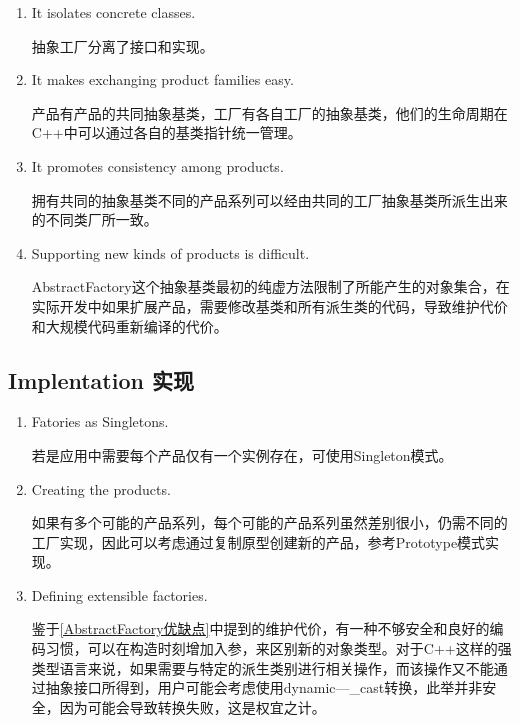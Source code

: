 \begin{enumerate}

\item It isolates concrete classes.

      抽象工厂分离了接口和实现。

\item It makes exchanging product families easy.
    
      产品有产品的共同抽象基类，工厂有各自工厂的抽象基类，他们的生命周期在C++中可以通过各自的基类指针统一管理。


\item It promotes consistency among products.

      拥有共同的抽象基类不同的产品系列可以经由共同的工厂抽象基类所派生出来的不同类厂所一致。

\item Supporting new kinds of products is difficult.

      AbstractFactory这个抽象基类最初的纯虚方法限制了所能产生的对象集合，在实际开发中如果扩展产品，需要修改基类和所有派生类的代码，导致维护代价和大规模代码重新编译的代价。
\end{enumerate}

\subsection{Implentation 实现}

\begin{enumerate}

\item Fatories as Singletons.

      若是应用中需要每个产品仅有一个实例存在，可使用Singleton模式。

\item Creating the products.

      如果有多个可能的产品系列，每个可能的产品系列虽然差别很小，仍需不同的工厂实现，因此可以考虑通过复制原型创建新的产品，参考Prototype模式实现。

\item Defining extensible factories.

      鉴于\ref{AbstractFactory优缺点}中提到的维护代价，有一种不够安全和良好的编码习惯，可以在构造时刻增加入参，来区别新的对象类型。对于C++这样的强类型语言来说，如果需要与特定的派生类别进行相关操作，而该操作又不能通过抽象接口所得到，用户可能会考虑使用dynamic—_cast转换，此举并非安全，因为可能会导致转换失败，这是权宜之计。

\end{enumerate}

